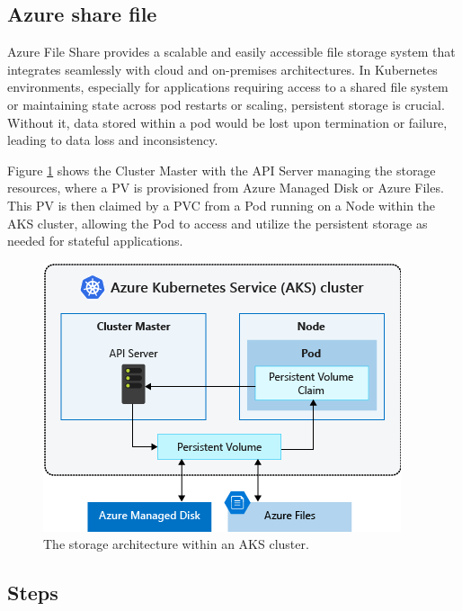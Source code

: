 \documentclass{article}
\begin{document}
\subsection{Azure share file}  
Azure File Share \cite{azurestorage} provides a scalable and easily accessible file storage system that integrates seamlessly with cloud and on-premises architectures. In Kubernetes environments, especially for applications requiring access to a shared file system or maintaining state across pod restarts or scaling, persistent storage is crucial. Without it, data stored within a pod would be lost upon termination or failure, leading to data loss and inconsistency. 

Figure \ref{fig:storarch} shows the Cluster Master with the API Server managing the storage resources, where a PV is provisioned from Azure Managed Disk or Azure Files. This PV is then claimed by a PVC from a Pod running on a Node within the AKS cluster, allowing the Pod to access and utilize the persistent storage as needed for stateful applications.

\begin{figure}[H]
\begin{center}
\includegraphics[scale = .7]{figures/aks-storage-options.png}
\caption{The storage architecture within an AKS cluster.}
\label{fig:storarch}
\end{center}
\end{figure}

\subsection*{Steps}
\end{document}
